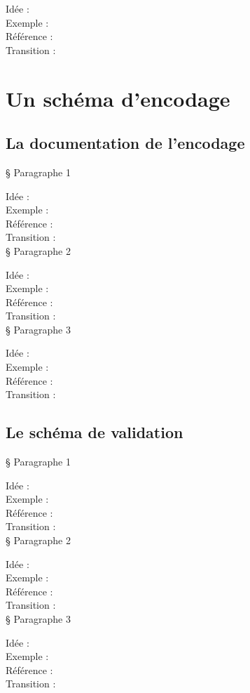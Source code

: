 Idée :\\
Exemple :\\
Référence :\\
Transition :\\


 \section{Un schéma d’encodage}
    \subsection{La documentation de l’encodage}

§ Paragraphe 1

Idée :\\
Exemple :\\
Référence :\\
Transition :\\

§ Paragraphe 2

Idée :\\
Exemple :\\
Référence :\\
Transition :\\

§ Paragraphe 3

Idée :\\
Exemple :\\
Référence :\\
Transition :\\

\subsection{Le schéma de validation}

§ Paragraphe 1

Idée :\\
Exemple :\\
Référence :\\
Transition :\\

§ Paragraphe 2

Idée :\\
Exemple :\\
Référence :\\
Transition :\\

§ Paragraphe 3

Idée :\\
Exemple :\\
Référence :\\
Transition :\\

